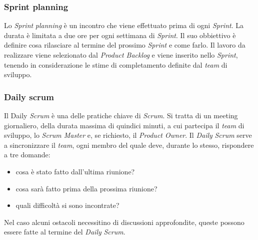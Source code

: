\subsubsection{Sprint planning}
Lo \textit{Sprint} \textit{planning} è un incontro che viene effettuato prima di ogni \textit{Sprint}. La durata è limitata a due ore per ogni settimana di \textit{Sprint}. Il suo obbiettivo è definire cosa rilasciare al termine del prossimo \textit{Sprint} e come farlo.
Il lavoro da realizzare viene selezionato dal \textit{Product Backlog} e viene inserito nello \textit{Sprint}, tenendo in considerazione le stime di completamento definite dal \textit{team} di sviluppo.

\subsubsection{Daily scrum}
Il Daily \textit{Scrum} è una delle pratiche chiave di \textit{Scrum}. Si tratta di un meeting giornaliero, della durata massima di quindici minuti, a cui partecipa il \textit{team} di sviluppo, lo \textit{Scrum Master} e, se richiesto, il \textit{Product Owner}. Il \textit{Daily} \textit{Scrum} serve a sincronizzare il \textit{team}, ogni membro del quale deve, durante lo stesso, rispondere a tre domande:
\begin{itemize}
    \item cosa è stato fatto dall'ultima riunione?
    \item cosa sarà fatto prima della prossima riunione?
    \item quali difficoltà si sono incontrate?
\end{itemize}
Nel caso alcuni ostacoli necessitino di discussioni approfondite, queste possono essere fatte al termine del \textit{Daily} \textit{Scrum}.

